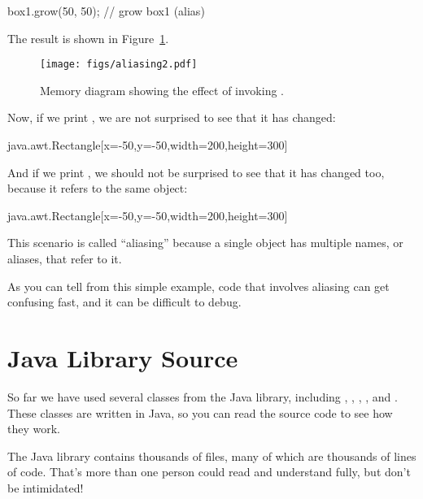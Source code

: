\begin{code}
box1.grow(50, 50);                // grow box1 (alias)
\end{code}

The result is shown in Figure~\ref{fig.aliasing2}.

\begin{figure}[!ht]
\begin{center}
\texttt{[image: figs/aliasing2.pdf]}
\caption{Memory diagram showing the effect of invoking .}
\label{fig.aliasing2}
\end{center}
\end{figure}

Now, if we print , we are not surprised to see that it has changed:

\begin{code}
java.awt.Rectangle[x=-50,y=-50,width=200,height=300]
\end{code}

And if we print , we should not be surprised to see that it has changed too, because it refers to the same object:

\begin{code}
java.awt.Rectangle[x=-50,y=-50,width=200,height=300]
\end{code}


This scenario is called ``aliasing'' because a single object has multiple names, or aliases, that refer to it.

As you can tell from this simple example, code that involves aliasing can get confusing fast, and it can be difficult to debug.


\section{Java Library Source}
\label{mutable-objects_java-library-source}
\label{src.zip}


So far we have used several classes from the Java library, including , , , , and .
These classes are written in Java, so you can read the source code to see how they work.


The Java library contains thousands of files, many of which are thousands of lines of code.
That's more than one person could read and understand fully, but don't be intimidated!

